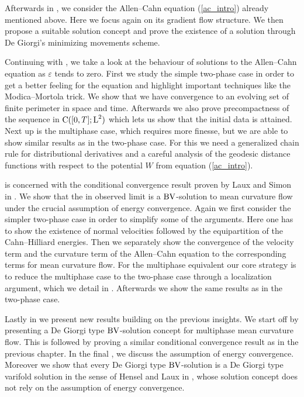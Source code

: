 Afterwards in , we consider the Allen--Cahn 
equation 
(\ref{ac_intro}) already mentioned above. Here we focus again on its 
gradient flow structure. We then propose a suitable solution concept and prove 
the existence of a solution through De Giorgi's minimizing movements scheme.

Continuing with , we take a 
look at the behaviour of solutions to the Allen--Cahn equation as $ 
\varepsilon $ tends to zero. First we study the simple two-phase case in 
order 
to get a better feeling for the equation and highlight important techniques 
like the Modica--Mortola trick. We show that we have convergence to an 
evolving set of finite perimeter in space and time. 
Afterwards we also prove 
precompactness of the sequence in $ \operatorname{C} ( [ 0 , T ] ; \operatorname{L}^{ 2 } ) $ which 
lets us show that the initial data is attained. 
Next up is the multiphase case, 
which requires more finesse, but we are able to show similar results as 
in the 
two-phase case. 
For this we need a generalized chain rule for distributional 
derivatives and a careful analysis of the geodesic distance functions with 
respect to the potential $ W $ from equation (\ref{ac_intro}).

 is concerned with the conditional 
convergence result proven by Laux and Simon in 
\cite{convergence_of_allen_cahn_equation_to_multiphase_mean_curvature_flow}. 
We show that the in  
observed limit is a $ \operatorname{BV} $-solution to mean curvature flow under the crucial 
assumption of energy convergence. 
Again we first consider the simpler two-phase case in 
order to simplify some of the arguments. Here one has to show the existence of 
normal velocities followed by the equipartition of the Cahn--Hilliard energies. 
Then we separately show the convergence of the velocity term and the curvature 
term 
of the Allen--Cahn equation to the corresponding terms for mean curvature flow. 
For the multiphase equivalent our core strategy is to reduce the 
multiphase case to the two-phase 
case through a localization argument, which we detail in 
. 
Afterwards we show the same results as in the two-phase case.

Lastly in  we present new results 
building on the previous insights. We start off by presenting a De Giorgi type 
$ \operatorname{BV} $-solution concept for multiphase mean curvature flow. This is followed 
by proving a similar conditional convergence result as in the previous chapter. 
In the final 
, we discuss the 
assumption of energy convergence. Moreover we show that every De 
Giorgi type $ \operatorname{BV} $-solution is a De Giorgi type varifold solution in the sense 
of Hensel and Laux in 
\cite{hensel_laux_varifold_solution_concept_for_mean_curvature_flow}, whose 
solution concept does not rely on the assumption of energy convergence.



